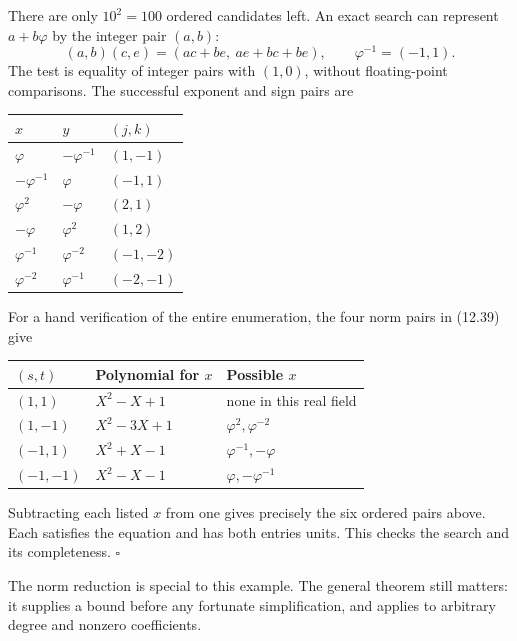 \documentclass[
  11pt,
  a4paper,
]{article}
\newcounter{none} %
\begin{document}
There are only \(10^2=100\) ordered candidates left. An exact search can
represent \(a+b\varphi\) by the integer pair \((a,b)\): \[
(a,b)(c,e)=(ac+be,\ ae+bc+be),\qquad
\varphi^{-1}=(-1,1).
\tag{12.41}
\] The test is equality of integer pairs with \((1,0)\), without
floating-point comparisons. The successful exponent and sign pairs are

{\def\LTcaptype{none} %
\begin{longtable}[]{@{}lll@{}}
\toprule\noalign{}
\(x\) & \(y\) & \((j,k)\) \\
\midrule\noalign{}
\endhead
\bottomrule\noalign{}
\endlastfoot
\(\varphi\) & \(-\varphi^{-1}\) & \((1,-1)\) \\
\(-\varphi^{-1}\) & \(\varphi\) & \((-1,1)\) \\
\(\varphi^2\) & \(-\varphi\) & \((2,1)\) \\
\(-\varphi\) & \(\varphi^2\) & \((1,2)\) \\
\(\varphi^{-1}\) & \(\varphi^{-2}\) & \((-1,-2)\) \\
\(\varphi^{-2}\) & \(\varphi^{-1}\) & \((-2,-1)\) \\
\end{longtable}
}

For a hand verification of the entire enumeration, the four norm pairs
in (12.39) give

{\def\LTcaptype{none} %
\begin{longtable}[]{@{}lll@{}}
\toprule\noalign{}
\((s,t)\) & Polynomial for \(x\) & Possible \(x\) \\
\midrule\noalign{}
\endhead
\bottomrule\noalign{}
\endlastfoot
\((1,1)\) & \(X^2-X+1\) & none in this real field \\
\((1,-1)\) & \(X^2-3X+1\) & \(\varphi^2,\varphi^{-2}\) \\
\((-1,1)\) & \(X^2+X-1\) & \(\varphi^{-1},-\varphi\) \\
\((-1,-1)\) & \(X^2-X-1\) & \(\varphi,-\varphi^{-1}\) \\
\end{longtable}
}

Subtracting each listed \(x\) from one gives precisely the six ordered
pairs above. Each satisfies the equation and has both entries units.
This checks the search and its completeness. \(\square\)

The norm reduction is special to this example. The general theorem still
matters: it supplies a bound before any fortunate simplification, and
applies to arbitrary degree and nonzero coefficients.
\end{document}
